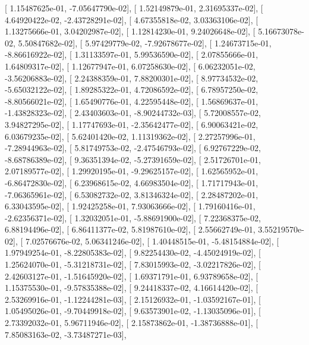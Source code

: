 \documentclass{article}
\begin{document}
       [  1.15487625e-01,  -7.05647790e-02],
       [  1.52149879e-01,   2.31695337e-02],
       [  4.64920422e-02,  -2.43728291e-02],
       [  4.67355818e-02,   3.03363106e-02],
       [  1.13275666e-01,   3.04202987e-02],
       [  1.12814230e-01,   9.24026648e-02],
       [  5.16673078e-02,   5.50847682e-02],
       [  5.97429779e-02,  -7.92678677e-02],
       [  1.24673715e-01,  -8.86616922e-02],
       [  1.31133597e-01,   5.99536590e-02],
       [  2.07855666e-01,   1.64809317e-02],
       [  1.12677947e-01,   6.07258630e-02],
       [  6.06232051e-02,  -3.56206883e-02],
       [  2.24388359e-01,   7.88200301e-02],
       [  8.97734532e-02,  -5.65032122e-02],
       [  1.89285322e-01,   4.72086592e-02],
       [  6.78957250e-02,  -8.80566021e-02],
       [  1.65490776e-01,   4.22595448e-02],
       [  1.56869637e-01,  -1.43828323e-02],
       [  2.43403603e-01,  -8.90244732e-03],
       [  5.72008557e-02,   3.94827295e-02],
       [  1.17747693e-01,  -2.35642477e-02],
       [  6.90063421e-02,   6.03679235e-02],
       [  5.62401420e-02,   1.11319362e-02],
       [  2.27257996e-01,  -7.28944963e-02],
       [  5.81749753e-02,  -2.47546793e-02],
       [  6.92767229e-02,  -8.68786389e-02],
       [  9.36351394e-02,  -5.27391659e-02],
       [  2.51726701e-01,   2.07189577e-02],
       [  1.29920195e-01,  -9.29625157e-02],
       [  1.62565952e-01,  -6.86472830e-02],
       [  6.23968615e-02,   4.66983504e-02],
       [  1.71717943e-01,  -7.06365961e-02],
       [  6.53082732e-02,   3.81346324e-02],
       [  2.28487202e-01,   6.33043595e-02],
       [  1.92425258e-01,   7.93063666e-02],
       [  1.79160416e-01,  -2.62356371e-02],
       [  1.32032051e-01,  -5.88691900e-02],
       [  7.22368375e-02,   6.88194496e-02],
       [  6.86411377e-02,   5.81987610e-02],
       [  2.55662749e-01,   3.55219570e-02],
       [  7.02576676e-02,   5.06341246e-02],
       [  1.40448515e-01,  -5.48154884e-02],
       [  1.97949254e-01,  -8.22805383e-02],
       [  9.82254430e-02,  -4.45024919e-02],
       [  1.25624070e-01,  -5.31218731e-02],
       [  7.83015993e-02,  -3.02217826e-02],
       [  2.42603127e-01,  -1.51645920e-02],
       [  1.69371791e-01,   6.93789658e-02],
       [  1.15375530e-01,  -9.57835388e-02],
       [  9.24418337e-02,   4.16614420e-02],
       [  2.53269916e-01,  -1.12244281e-03],
       [  2.15126932e-01,  -1.03592167e-01],
       [  1.05495026e-01,  -9.70449918e-02],
       [  9.63573901e-02,  -1.13035096e-01],
       [  2.73392032e-01,   5.96711946e-02],
       [  2.15873862e-01,  -1.38736888e-01],
       [  7.85083163e-02,  -3.73487271e-03],
\end{document}
